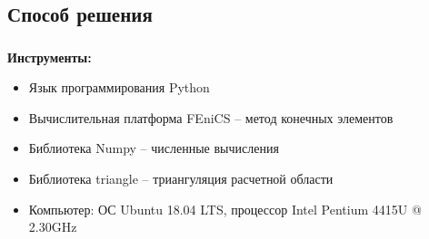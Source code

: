 
\subsection{Способ решения}

\begin{frame}
\frametitle{\insertsection}
\framesubtitle{\insertsubsection}

\textbf{Инструменты:}
\begin{itemize}
    \item Язык программирования Python
    \item Вычислительная платформа FEniCS -- метод конечных элементов
    \item Библиотека Numpy -- численные вычисления
    \item Библиотека triangle -- триангуляция расчетной области
    \item Компьютер: ОС Ubuntu 18.04 LTS, процессор Intel Pentium 4415U @ 2.30GHz
\end{itemize}
\end{frame}


% 
% 
% 

